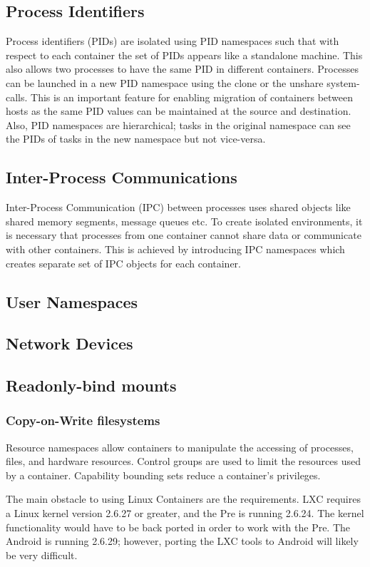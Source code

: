 \subsection{Process Identifiers}
Process identifiers (PIDs) are isolated using PID namespaces such that with respect to each container the set of PIDs appears like a standalone machine. This also allows two processes to  have the same PID in different containers. Processes can be launched in a new PID namespace using the clone or the unshare system-calls. This is an important feature for enabling migration of containers between hosts as the same PID values can be maintained at the source and destination. Also, PID namespaces are hierarchical; tasks in the original namespace can see the PIDs of tasks in the new namespace but not vice-versa.  

\subsection{Inter-Process Communications}
Inter-Process Communication (IPC) between processes uses shared objects like shared memory segments, message queues etc. To create isolated environments, it is necessary that processes from one container cannot share data or communicate with other containers. This is achieved by introducing IPC namespaces which creates separate set of IPC objects for each container.

\subsection{User Namespaces}

\subsection{Network Devices}


\subsection{Readonly-bind mounts}


\subsubsection{Copy-on-Write filesystems}

Resource namespaces allow containers to manipulate the accessing of processes, files, and hardware resources.  Control groups are used to limit the resources used by a container.  Capability bounding sets reduce a container's privileges.  

The main obstacle to using Linux Containers are the requirements.  LXC requires a Linux kernel version 2.6.27 or greater, and the Pre is running 2.6.24.  The kernel functionality would have to be back ported in order to work with the Pre.  The Android is running 2.6.29; however, porting the LXC tools to Android will likely be very difficult.
